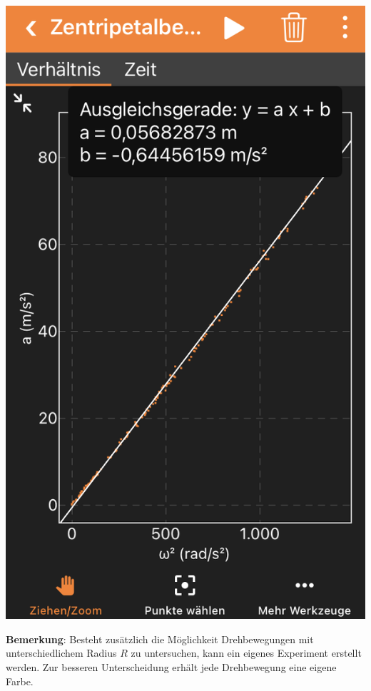 \documentclass[../main.tex]{subfiles}
\begin{document}
\begin{tcolorbox}
\begin{minipage}[]{0.22\textwidth}
        \vspace{0.3cm}
        \includegraphics[width=\textwidth]{img/app2}
    \end{minipage}

    \vspace{0.7cm}
    \begin{minipage}[]{0.80\textwidth}
        \textbf{Bemerkung}: Besteht zusätzlich die Möglichkeit Drehbewegungen mit unterschiedlichem Radius $R$ zu untersuchen, kann ein eigenes Experiment erstellt werden. Zur besseren Unterscheidung erhält jede Drehbewegung eine eigene Farbe.


\end{minipage}
\end{tcolorbox}
\end{document}
